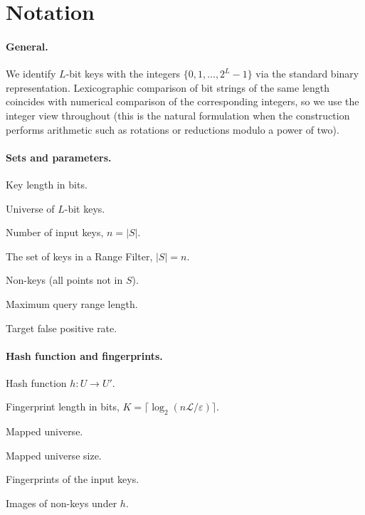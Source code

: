 \section{Notation}
\label{sec:notation}

\paragraph{General.}
We identify $L$-bit keys with the integers $\{0, 1, \dots, 2^L - 1\}$ via
the standard binary representation. Lexicographic comparison of bit strings
of the same length coincides with numerical comparison of the corresponding
integers, so we use the integer view throughout (this is the natural
formulation when the construction performs arithmetic such as rotations
or reductions modulo a power of two).

\paragraph{Sets and parameters.}
\begin{description}[style=nextline, leftmargin=4cm, labelwidth=3.4cm]
  \item[$L$] Key length in bits.
  \item[{$U = [0, 2^L)$}] Universe of $L$-bit keys.
  \item[$n$] Number of input keys, $n = |S|$.
  \item[$S \subseteq U$] The set of keys in a Range Filter, $|S| = n$.
  \item[$Y = U \setminus S$] Non-keys (all points not in $S$).
  \item[$\mathcal{L}$] Maximum query range length.
  \item[$\varepsilon$] Target false positive rate.
\end{description}

\paragraph{Hash function and fingerprints.}
\begin{description}[style=nextline, leftmargin=4cm, labelwidth=3.4cm]
  \item[$h$] Hash function $h\colon U \to U'$.
  \item[$K$] Fingerprint length in bits, $K = \lceil\log_2(n\mathcal{L}/\varepsilon)\rceil$.
  \item[{$U' = [0, 2^K)$}] Mapped universe.
  \item[{$r = 2^K$}] Mapped universe size.
  \item[$S' = h(S)$] Fingerprints of the input keys.
  \item[$Y' = h(Y)$] Images of non-keys under $h$.
\end{description}

